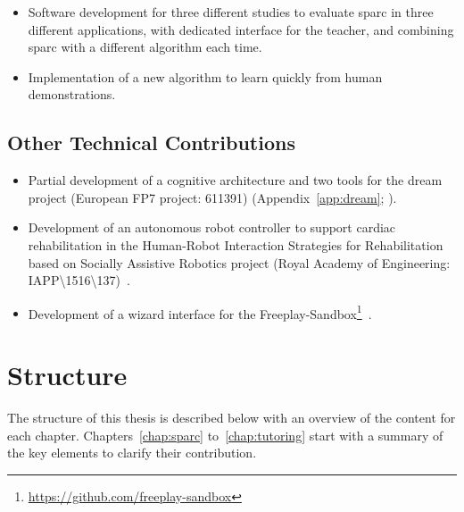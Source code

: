 \begin{itemize}
	\item Software development for three different studies to evaluate \gls{sparc} in three different applications, with dedicated interface for the teacher, and combining \gls{sparc} with a different algorithm each time.
	\item Implementation of a new algorithm to learn quickly from human demonstrations.
\end{itemize}

\subsection{Other Technical Contributions}

\begin{itemize}
	\item Partial development of a cognitive architecture and two tools for the \acrshort{dream} project (European FP7 project: 611391) (Appendix~\ref{app:dream}; \citealt{esteban2017build}).
	\item Development of an autonomous robot controller to support cardiac rehabilitation in the Human-Robot Interaction Strategies for Rehabilitation based on Socially Assistive Robotics project (Royal Academy of Engineering: IAPP\textbackslash1516\textbackslash137)~\citep{lara2017human,casas2018social}.
	\item Development of a wizard interface for the Freeplay-Sandbox\footnote{\url{https://github.com/freeplay-sandbox}}~\citep{lemaignan2018pinsoro,wallbridge2018spatial}.
\end{itemize}
	
\section{Structure}\label{sec:intro_struct}

The structure of this thesis is described below with an overview of the content for each chapter. Chapters~\ref{chap:sparc} to~\ref{chap:tutoring} start with a summary of the key elements to clarify their contribution.

